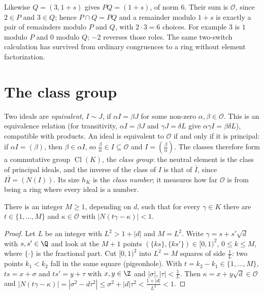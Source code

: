 Likewise $Q=(3,1+s)$ gives $PQ=(1+s)$, of norm $6$.
Their sum is $\mathcal O$, since $2\in P$ and $3\in Q$;
hence $P\cap Q=PQ$ and a remainder modulo $1+s$ is exactly
a pair of remainders modulo $P$ and $Q$, with $2\cdot3=6$ choices.
For example $3$ is $1$ modulo $P$ and $0$ modulo $Q$;
$-2$ reverses those roles. The same two-switch calculation has
survived from ordinary congruences to a ring without element factorization.

\section{The class group}

Two ideals are \emph{equivalent}, $I\sim J$, if $\alpha I=\beta J$ for some non-zero $\alpha,\beta\in\mathcal O$. This is an equivalence relation (for transitivity, $\alpha I=\beta J$ and $\gamma J=\delta L$ give $\alpha\gamma I=\beta\delta L$), compatible with products. An ideal is equivalent to $\mathcal O$ if and only if it is principal: if $\alpha I=(\beta)$, then $\beta\in\alpha I$, so $\frac\beta\alpha\in I\subseteq\mathcal O$ and $I=\left(\frac\beta\alpha\right)$. The classes therefore form a commutative group $\operatorname{Cl}(K)$, the \emph{class group}: the neutral element is the class of principal ideals, and the inverse of the class of $I$ is that of $\bar I$, since $I\bar I=(N(I))$. Its size $h_K$ is the \emph{class number}; it measures how far $\mathcal O$ is from being a ring where every ideal is a number.

\begin{lemma}\label{lem:approx}
There is an integer $M\ge1$, depending on $d$, such that for every $\gamma\in K$ there are $t\in\{1,\dots,M\}$ and $\kappa\in\mathcal O$ with $|N(t\gamma-\kappa)|<1$.
\end{lemma}
\begin{proof}
Let $L$ be an integer with $L^2>1+|d|$ and $M=L^2$. Write $\gamma=s+s'\sqrt d$ with $s,s'\in\Q$ and look at the $M+1$ points $(\{ks\},\{ks'\})\in[0,1)^2$, $0\le k\le M$, where $\{\cdot\}$ is the fractional part. Cut $[0,1)^2$ into $L^2=M$ squares of side $\frac1L$: two points $k_1<k_2$ fall in the same square (pigeonhole). With $t=k_2-k_1\in\{1,\dots,M\}$, $ts=x+\sigma$ and $ts'=y+\tau$ with $x,y\in\Z$ and $|\sigma|,|\tau|<\frac1L$. Then $\kappa=x+y\sqrt d\in\mathcal O$ and $|N(t\gamma-\kappa)|=|\sigma^2-d\tau^2|\le\sigma^2+|d|\tau^2<\frac{1+|d|}{L^2}<1$.
\end{proof}

